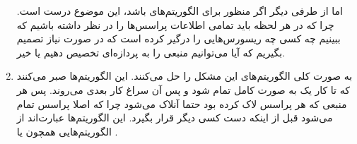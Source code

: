 \begin{enumerate}
    اما از طرفی دیگر اگر منظور برای الگوریتم‌های
    باشد، این موضوع درست است. چرا که در هر لحظه باید تمامی اطلاعات پراسس‌ها را در نظر داشته باشیم که
    ببینیم چه کسی چه ریسورس‌هایی را درگیر کرده است که در صورت نیاز تصمیم بگیریم که آیا می‌توانیم منبعی را
    به پردازه‌ای تخصیص دهیم یا خیر.
    \item به صورت کلی الگوریتم‌های
    این مشکل را حل می‌کنند. این الگوریتم‌ها صبر می‌کنند که تا کار یک
    به صورت کامل تمام شود و پس آن سراغ کار بعدی می‌روند. پس هر منبعی که هر پراسس لاک کرده بود
    حتما آنلاک می‌شود چرا که اصلا پراسس تمام می‌شود قبل از اینکه
    دست کسی دیگر قرار بگیرد. این الگوریتم‌ها عبارت‌اند از الگوریتم‌هایی همچون
    یا
    .
\end{enumerate}



